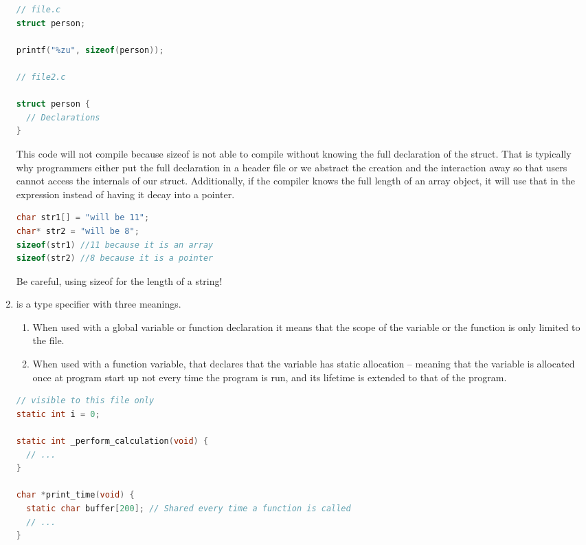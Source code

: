 \begin{enumerate}
	      \begin{lstlisting}[language=C]
// file.c
struct person;

printf("%zu", sizeof(person));

// file2.c

struct person {
  // Declarations
}
\end{lstlisting}

	      This code will not compile because sizeof is not able to compile  without knowing the full declaration of the  struct.
        That is typically why programmers either put the full declaration in a header file or we abstract the creation and the interaction away so that users cannot access the internals of our struct.
        Additionally, if the compiler knows the full length of an array object, it will use that in the expression instead of having it decay into a pointer.

	      \begin{lstlisting}[language=C]
char str1[] = "will be 11";
char* str2 = "will be 8";
sizeof(str1) //11 because it is an array
sizeof(str2) //8 because it is a pointer
\end{lstlisting}

	      Be careful, using sizeof for the length of a string!

	\item {} is a type specifier with three meanings.

	      \begin{enumerate}
		      \item When used with a global variable or function declaration it means that the scope of the variable or the function is only limited to the file.
		      \item When used with a function variable, that declares that the variable has static allocation -- meaning that the variable is allocated once at program start up not every time the program is run, and its lifetime is extended to that of the program.
	      \end{enumerate}

	      \begin{lstlisting}[language=C]
// visible to this file only
static int i = 0;

static int _perform_calculation(void) {
  // ...
}

char *print_time(void) {
  static char buffer[200]; // Shared every time a function is called
  // ...
}
\end{lstlisting}


\end{enumerate}
